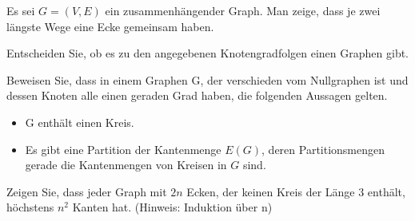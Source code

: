 \documentclass[10pt, a4paper]{exam}
\begin{document}
\begin{questions}
    \question Es sei $G=(V,E)$ ein zusammenhängender Graph. Man zeige, dass je zwei längste Wege eine Ecke gemeinsam haben.

    \question Entscheiden Sie, ob es zu den angegebenen Knotengradfolgen einen Graphen gibt.

    \question Beweisen Sie, dass in einem Graphen G, der verschieden vom Nullgraphen ist und dessen Knoten alle einen geraden Grad haben, die folgenden Aussagen gelten.
    \begin{itemize}
        \item G enthält einen Kreis.
        \item Es gibt eine Partition der Kantenmenge $E(G)$, deren Partitionsmengen gerade die Kantenmengen von Kreisen in $G$ sind.
    \end{itemize}

    \question Zeigen Sie, dass jeder Graph mit $2n$ Ecken, der keinen Kreis der Länge 3 enthält, höchstens $n^2$ Kanten hat. (Hinweis: Induktion über n)

    \question

\end{questions}
\end{document}
